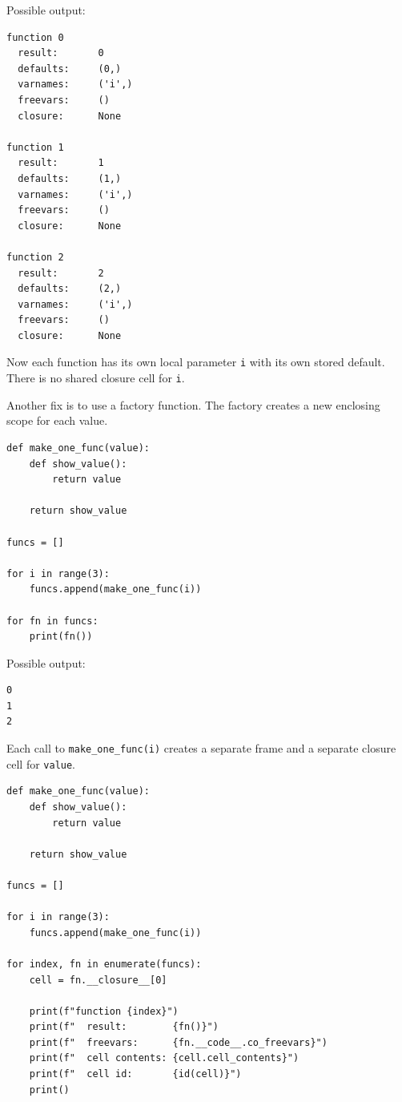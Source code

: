 Possible output:

\begin{verbatim}
function 0
  result:       0
  defaults:     (0,)
  varnames:     ('i',)
  freevars:     ()
  closure:      None

function 1
  result:       1
  defaults:     (1,)
  varnames:     ('i',)
  freevars:     ()
  closure:      None

function 2
  result:       2
  defaults:     (2,)
  varnames:     ('i',)
  freevars:     ()
  closure:      None
\end{verbatim}

Now each function has its own local parameter \texttt{i} with its own stored default. There is no shared closure cell for \texttt{i}.

Another fix is to use a factory function. The factory creates a new enclosing scope for each value.

\begin{verbatim}
def make_one_func(value):
    def show_value():
        return value

    return show_value

funcs = []

for i in range(3):
    funcs.append(make_one_func(i))

for fn in funcs:
    print(fn())
\end{verbatim}

Possible output:

\begin{verbatim}
0
1
2
\end{verbatim}

Each call to \texttt{make\_one\_func(i)} creates a separate frame and a separate closure cell for \texttt{value}.

\begin{verbatim}
def make_one_func(value):
    def show_value():
        return value

    return show_value

funcs = []

for i in range(3):
    funcs.append(make_one_func(i))

for index, fn in enumerate(funcs):
    cell = fn.__closure__[0]

    print(f"function {index}")
    print(f"  result:        {fn()}")
    print(f"  freevars:      {fn.__code__.co_freevars}")
    print(f"  cell contents: {cell.cell_contents}")
    print(f"  cell id:       {id(cell)}")
    print()
\end{verbatim}

